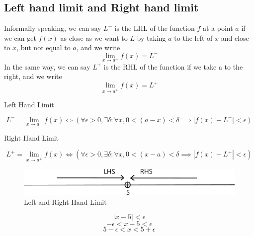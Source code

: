 \documentclass[12pt]{article}
\begin{document}

    

\subsection{Left hand limit and Right hand limit}

Informally speaking, we can say $L^-$ is the LHL of the function $f$ at a point $a$ if we can get $f(x)$ as close as we want to $L$ by taking $a$ to the left of $x$ and close to $x$, but not equal to $a$, and we write \[
    \lim_{x \to a^-} f(x) = L^-
    \] In the same way, we can say $L^+$ is the RHL of the function if we take a to the right, and we write \[
    \lim_{x \to a^+} f(x) = L^+
\]

\begin{definition}{Left Hand Limit}

    \[ L^- = \lim_{x \to a^-} f(x) \iff \left( \forall\epsilon>0,\exists\delta : \forall x, 0<(a-x)<\delta \implies |f(x)-L^-|<\epsilon \right) \]
\end{definition}
\begin{definition}{Right Hand Limit}

\[
    L^+ = \lim_{x \to a^+} f(x) \iff \left( \forall\epsilon>0,\exists\delta : \forall x, 0<(x-a)<\delta \implies |f(x)-L^+|<\epsilon \right) 
\]
\end{definition}

\begin{figure}[htpb]
    \centering
    \includegraphics[scale=0.5]{Limit1.png}
    \caption{\small Left and Right Hand Limit}
\end{figure}
\[ |x-5| < \epsilon \]
\[ -\epsilon < x-5 < \epsilon \]
\[ 5-\epsilon < x < 5+\epsilon \]
\end{document}
